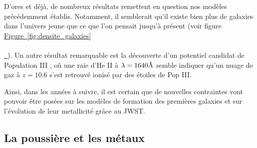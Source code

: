 \documentclass[12pt, a4paper]{article}
\newcommand*{\figref}[2][]{%
  \hyperref[{#2}]{%
    Figure~\ref*{#2}%
    \ifx\\#1\\%
    \else
      \,#1%
    \fi
  }%
}
\begin{document}
D'ores et déjà, de nombreux résultats remettent en question nos modèles précédemment établis. Notamment, il semblerait qu'il existe bien plus de galaxies dans l'univers jeune que ce que l'on pensait jusqu'à présent \parencite{2023arXiv231104279F} (voir figure \figref{fig:densite_galaxies}). Un autre résultat remarquable est la découverte d'un potentiel candidat de Population III \parencite{2023arXiv230600953M}, où une raie d'He II à $\lambda = 1640 \text{\r{A}}$ semble indiquer qu'un nuage de gaz à $z = 10.6$ s'est retrouvé ionisé par des étoiles de Pop III. 

Ainsi, dans les années à suivre, il est certain que de nouvelles contraintes vont pouvoir être posées sur les modèles de formation des premières galaxies et sur l'évolution de leur metallicité grâce au JWST.

\subsection{La poussière et les métaux}
\end{document}
